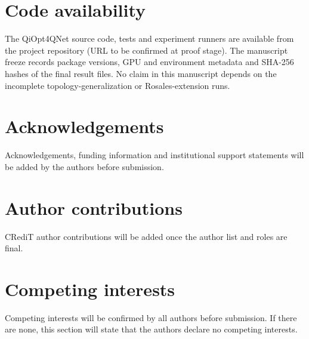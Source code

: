 \documentclass[pdflatex,sn-nature]{sn-jnl}
\theoremstyle{plain}
\theoremstyle{remark}
\begin{document}
\section{Code availability}
The QiOpt4QNet source code, tests and experiment runners are available from the project repository (URL to be confirmed at proof stage). The manuscript freeze records package versions, GPU and environment metadata and SHA-256 hashes of the final result files. No claim in this manuscript depends on the incomplete topology-generalization or Rosales-extension runs.

\section{Acknowledgements}
Acknowledgements, funding information and institutional support statements will be added by the authors before submission.

\section{Author contributions}
CRediT author contributions will be added once the author list and roles are final.

\section{Competing interests}
Competing interests will be confirmed by all authors before submission. If there are none, this section will state that the authors declare no competing interests.
\end{document}

